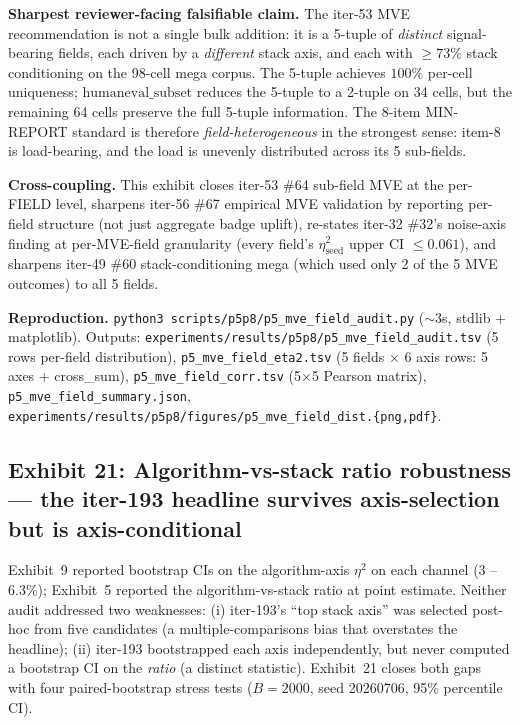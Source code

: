 \textbf{Sharpest reviewer-facing falsifiable claim.} The iter-53 MVE
recommendation is not a single bulk addition: it is a 5-tuple of
\emph{distinct} signal-bearing fields, each driven by a \emph{different}
stack axis, and each with $\geq 73\%$ stack conditioning on the 98-cell
mega corpus. The 5-tuple achieves $100\%$ per-cell uniqueness;
$\mathrm{humaneval\_subset}$ reduces the 5-tuple to a 2-tuple on 34
cells, but the remaining 64 cells preserve the full 5-tuple
information. The 8-item MIN-REPORT standard is therefore
\emph{field-heterogeneous} in the strongest sense: item-8 is
load-bearing, and the load is unevenly distributed across its 5
sub-fields.

\textbf{Cross-coupling.} This exhibit closes iter-53 \#64
sub-field MVE at the per-FIELD level, sharpens iter-56 \#67
empirical MVE validation by reporting per-field structure (not just
aggregate badge uplift), re-states iter-32 \#32's noise-axis
finding at per-MVE-field granularity (every field's
$\eta^2_{\mathrm{seed}}$ upper CI $\leq 0.061$), and sharpens
iter-49 \#60 stack-conditioning mega (which used only 2 of the 5
MVE outcomes) to all 5 fields.

\textbf{Reproduction.}
\texttt{python3 scripts/p5p8/p5\_mve\_field\_audit.py}
($\sim$3s, stdlib + matplotlib). Outputs:
\texttt{experiments/results/p5p8/p5\_mve\_field\_audit.tsv} (5 rows
per-field distribution),
\texttt{p5\_mve\_field\_eta2.tsv} (5 fields $\times$ 6 axis rows:
5 axes + cross\_sum),
\texttt{p5\_mve\_field\_corr.tsv} (5$\times$5 Pearson matrix),
\texttt{p5\_mve\_field\_summary.json},
\texttt{experiments/results/p5p8/figures/p5\_mve\_field\_dist.\{png,pdf\}}.

\subsection{Exhibit 21: Algorithm-vs-stack ratio robustness --- the iter-193 headline survives axis-selection but is axis-conditional}
\label{sec:p5-exhibit-ratio-robustness}

Exhibit~9 reported bootstrap CIs on the algorithm-axis $\eta^2$ on each
channel (3 -- 6.3\%); Exhibit~5 reported the algorithm-vs-stack ratio at
point estimate. Neither audit addressed two weaknesses: (i) iter-193's
``top stack axis'' was selected post-hoc from five candidates (a
multiple-comparisons bias that overstates the headline); (ii) iter-193
bootstrapped each axis independently, but never computed a bootstrap CI on
the \emph{ratio} (a distinct statistic). Exhibit~21 closes both gaps with
four paired-bootstrap stress tests ($B{=}2000$, seed 20260706, 95\%
percentile CI).

